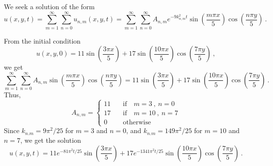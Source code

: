 \begin{egg}
We seek a solution of the form
\[
u(x,y,t) = \sum_{m=1}^\infty \sum_{n=0}^\infty u_{n,m}(x,y,t)
= \sum_{m=1}^\infty \sum_{n=0}^\infty
A_{n,m} e^{-9 k_{n,m}^2 t} \sin\left(\frac{m\pi x}{5}\right)
\cos\left(\frac{n\pi y}{5}\right) \ .
\]

From the initial condition
\[
u(x,y,0) = 11 \sin\left(\frac{3\pi x}{5}\right) +
17 \sin\left(\frac{10\pi x}{5}\right)
\cos\left(\frac{7\pi y }{5}\right) \ ,
\]
we get
\[
\sum_{m=1}^\infty \sum_{n=0}^\infty
A_{n,m} \sin\left(\frac{m\pi x}{5}\right) \cos\left(\frac{n\pi y}{5}\right) =
11 \sin\left(\frac{3\pi x}{5}\right) + 17 \sin\left(\frac{10\pi x}{5}\right)
\cos\left(\frac{7\pi y }{5}\right) \ .
\]
Thus,
\[
A_{n,m} =
\begin{cases}
11 & \quad \text{if} \quad m=3\ , \ n=0 \\
17 & \quad \text{if} \quad m=10\ , \ n=7 \\
0 & \quad \text{otherwise}
\end{cases}
\]
Since $k_{n.m} = 9 \pi^2/25$ for $m=3$ and $n=0$, and
$k_{n.m} = 149 \pi^2/25$ for $m=10$ and $n=7$, we get the solution
\[
u(x,y,t) = 11 e^{-81 \pi^2 t/25} \sin\left(\frac{3\pi x}{5}\right)
+ 17 e^{-1341 \pi^2 t/25} \sin\left(\frac{10\pi x}{5}\right)
\cos\left(\frac{7\pi y}{5}\right) \ .
\]
\end{egg}

